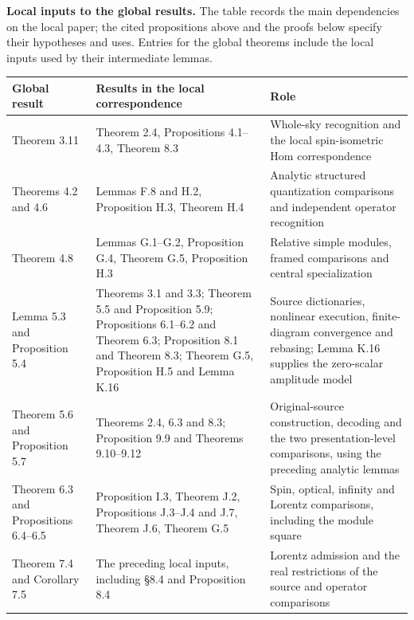 \documentclass[
  english,
  11pt,
  reqno]{amsart}
\newcounter{none} %
\begin{document}
\textbf{Local inputs to the global results.} The table records the main
dependencies on the local paper; the cited propositions above and the
proofs below specify their hypotheses and uses. Entries for the global
theorems include the local inputs used by their intermediate lemmas.

{\def\LTcaptype{none} %
\begin{longtable}[]{@{}
  >{\raggedright\arraybackslash}p{}
  >{\raggedright\arraybackslash}p{}
  >{\raggedright\arraybackslash}p{}@{}}
\toprule\noalign{}
\begin{minipage}[b]{\linewidth}\raggedright
Global result
\end{minipage} & \begin{minipage}[b]{\linewidth}\raggedright
Results in the local correspondence
\end{minipage} & \begin{minipage}[b]{\linewidth}\raggedright
Role
\end{minipage} \\
\midrule\noalign{}
\endhead
\bottomrule\noalign{}
\endlastfoot
Theorem 3.11 & Theorem 2.4, Propositions 4.1--4.3, Theorem 8.3 &
Whole-sky recognition and the local spin-isometric Hom correspondence \\
Theorems 4.2 and 4.6 & Lemmas F.8 and H.2, Proposition H.3, Theorem H.4
& Analytic structured quantization comparisons and independent operator
recognition \\
Theorem 4.8 & Lemmas G.1--G.2, Proposition G.4, Theorem G.5, Proposition
H.3 & Relative simple modules, framed comparisons and central
specialization \\
Lemma 5.3 and Proposition 5.4 & Theorems 3.1 and 3.3; Theorem 5.5 and
Proposition 5.9; Propositions 6.1--6.2 and Theorem 6.3; Proposition 8.1
and Theorem 8.3; Theorem G.5, Proposition H.5 and Lemma K.16 & Source
dictionaries, nonlinear execution, finite-diagram convergence and
rebasing; Lemma K.16 supplies the zero-scalar amplitude model \\
Theorem 5.6 and Proposition 5.7 & Theorems 2.4, 6.3 and 8.3; Proposition
9.9 and Theorems 9.10--9.12 & Original-source construction, decoding and
the two presentation-level comparisons, using the preceding analytic
lemmas \\
Theorem 6.3 and Propositions 6.4--6.5 & Proposition I.3, Theorem J.2,
Propositions J.3--J.4 and J.7, Theorem J.6, Theorem G.5 & Spin, optical,
infinity and Lorentz comparisons, including the module square \\
Theorem 7.4 and Corollary 7.5 & The preceding local inputs, including
§8.4 and Proposition 8.4 & Lorentz admission and the real restrictions
of the source and operator comparisons \\
\end{longtable}
}
\end{document}
